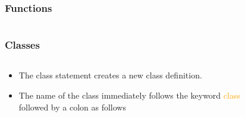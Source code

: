 \documentclass{beamer}
\begin{document}
\begin{frame}[fragile]
	\frametitle{Functions}
	\begin{columns}[c]
		\begin{column}{30cm}
			\vspace{.1cm}
		\end{column}
	\end{columns}
\end{frame}

\begin{frame}
	\frametitle{Classes}
	\begin{columns}[c]
		\begin{column}{30cm}
			\vspace{.1cm}
			\begin{itemize}
				\justifying
				\item The class statement creates a new class definition.
				\item The name of the class immediately follows the keyword \textcolor{orange}{class} \\
				followed by a colon as follows
			\end{itemize}
		\end{column}
	\end{columns}
\end{frame}
\end{document}
